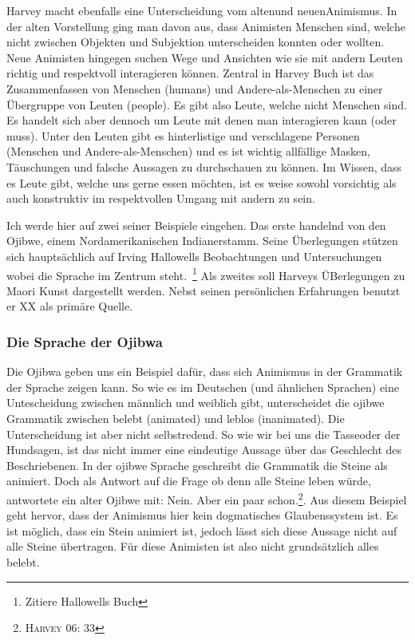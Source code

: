 Harvey macht ebenfalls eine Unterscheidung vom \glqq alten\grqq und \glqq neuen\grqq Animismus. In der alten Vorstellung ging man davon aus, dass Animisten Menschen sind, welche nicht zwischen Objekten und Subjektion unterscheiden konnten oder wollten. Neue Animisten hingegen suchen Wege und Ansichten wie sie mit andern Leuten richtig und respektvoll interagieren können. Zentral in Harvey Buch ist das Zusammenfassen von Menschen (humans) und Andere-als-Menschen zu einer Übergruppe von Leuten (people). Es gibt also Leute, welche nicht Menschen sind. Es handelt sich aber dennoch um Leute mit denen man interagieren kann (oder muss). Unter den Leuten gibt es hinterlistige und verschlagene Personen (Menschen und Andere-als-Menschen) und es ist wichtig allfällige Masken, Täuschungen und falsche Aussagen zu durchschauen zu können. Im Wissen, dass es Leute gibt, welche uns gerne essen möchten, ist es weise sowohl vorsichtig als auch konstruktiv im respektvollen Umgang mit andern zu sein.

Ich werde hier auf zwei seiner Beispiele eingehen. Das erste handelnd von den Ojibwe, einem Nordamerikanischen Indianerstamm. Seine Überlegungen stützen sich hauptsächlich auf Irving Hallowells Beobachtungen und Untersuchungen wobei die Sprache im Zentrum steht.~\footnote{Zitiere Hallowells Buch} Als zweites soll Harveys ÜBerlegungen zu Maori Kunst dargestellt werden. Nebst seinen persönlichen Erfahrungen benutzt er XX als primäre Quelle.

\subsubsection*{Die Sprache der Ojibwa}
Die Ojibwa geben uns ein Beispiel dafür, dass sich Animismus in der Grammatik der Sprache zeigen kann. So wie es im Deutschen (und ähnlichen Sprachen) eine Untescheidung zwischen männlich und weiblich gibt, unterscheidet die ojibwe Grammatik zwischen belebt (animated) und leblos (inanimated). Die Unterscheidung ist aber nicht selbstredend. So wie wir bei uns \glqq die Tasse\grqq oder \glqq der Hund\grqq sagen, ist das nicht immer eine eindeutige Aussage über das Geschlecht des Beschriebenen. In der ojibwe Sprache geschreibt die Grammatik die Steine als animiert. Doch als Antwort auf die Frage ob denn alle Steine leben würde, antwortete ein alter Ojibwe mit: \glqq Nein. Aber ein paar schon.\grqq\footnote{\textsc{Harvey 06: 33}}. Aus diesem Beispiel geht hervor, dass der Animismus hier kein dogmatisches Glaubenssystem ist. Es ist möglich, dass ein Stein animiert ist, jedoch lässt sich diese Aussage nicht auf alle Steine übertragen. Für diese Animisten ist also nicht grundsätzlich alles belebt.

